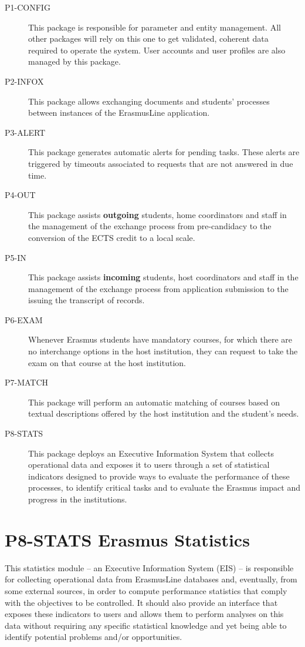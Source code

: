 \begin{description}

\item[P1-CONFIG]
This package is responsible for parameter and entity management. All other
packages will rely on this one to get validated, coherent data required to
operate the system. User accounts and user profiles are also managed by this
package.

\item[P2-INFOX]
This package allows exchanging documents and students’ processes between
instances of the ErasmusLine application.

\item[P3-ALERT]
This package generates automatic alerts for pending tasks. These alerts are
triggered by timeouts associated to requests that are not answered in due time.

\item[P4-OUT]
This package assists \textbf{outgoing} students, home coordinators and staff in
the management of the exchange process from pre-candidacy to the conversion of the
ECTS credit to a local scale.

\item[P5-IN]
This package assists \textbf{incoming} students, host coordinators and staff in
the management of the exchange process from application submission to the
issuing the transcript of records.

\item[P6-EXAM]
Whenever Erasmus students have mandatory courses, for which there are no
interchange options in the host institution, they can request to take the exam
on that course at the host institution.

\item[P7-MATCH]
This package will perform an automatic matching of courses based on textual
descriptions offered by the host institution and the student’s needs.

\item[P8-STATS]
This package deploys an Executive Information System that collects operational
data and exposes it to users through a set of statistical indicators designed to
provide ways to evaluate the performance of these processes, to identify
critical tasks and to evaluate the Erasmus impact and progress in the
institutions.

\end{description}

\section{P8-STATS Erasmus Statistics}
This statistics module – an Executive Information System (EIS) – is responsible
for collecting operational data from ErasmusLine databases and, eventually, from
some external sources, in order to compute performance statistics that comply
with the objectives to be controlled. It should also provide an interface that
exposes these indicators to users and allows them to perform analyses on this
data without requiring any specific statistical knowledge and yet being able to
identify potential problems and/or opportunities.


